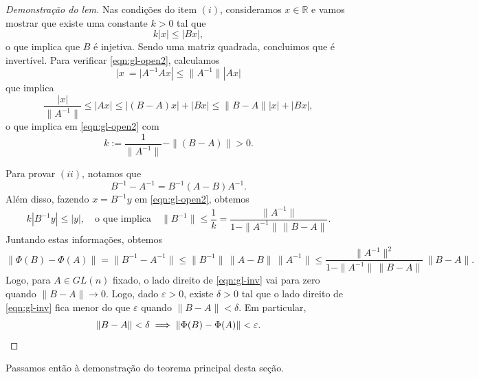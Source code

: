\begin{proof}[Demonstração do lem]
	Nas condições do item $(i)$, consideramos $x \in \mathbb{R}$ e vamos mostrar que existe uma constante $k>0$ tal que
	\begin{equation}\label{eqn:gl-open2}
	k |x| \le |Bx|,
	\end{equation} o que implica que $B$ é injetiva. Sendo uma matriz quadrada, concluimos que é invertível. Para verificar \eqref{eqn:gl-open2}, calculamos
	\[
	|x\ = |A^{-1} A x| \le \|A^{-1}\| | A x| 
	\] que implica
	\[
	\frac{|x|}{ \|A^{-1}\|} \le |A x| \le |(B-A)x| + |Bx| \le \|B-A\| |x| + |Bx|,
	\] o que implica em \eqref{eqn:gl-open2} com 
	\[
	k := \frac{1}{\|A^{-1}\|} - \|(B-A)\| > 0.
	\]
	
	Para provar $(ii)$, notamos que 
	\[
	B^{-1} - A^{-1} = B^{-1} (A - B) A^{-1}.
	\] Além disso, fazendo $x = B^{-1}y$ em \eqref{eqn:gl-open2}, obtemos
	\[
	k | B^{-1}y | \le |y|, \quad \text{o que implica} \quad \|B^{-1}\| \le \frac{1}{k} = \frac{\| A^{-1} \|}{1 - \|A^{-1}\| \, \|B-A\|}.
	\] Juntando estas informações, obtemos
	\begin{equation}\label{eqn:gl-inv}
	\| \Phi (B) - \Phi (A) \| = \|B^{-1} - A^{-1}\| \le \| B^{-1} \| \, \| A - B \| \, \| A^{-1} \| \le \frac{\| A^{-1} \|^2}{1 - \|A^{-1}\| \, \|B-A\|} \, \|B-A\|.
	\end{equation} Logo, para $A \in GL(n)$ fixado, o lado direito de \eqref{eqn:gl-inv} vai para zero quando $\|B- A\| \to 0$. Logo, dado $\varepsilon> 0$, existe $\delta > 0$ tal que o lado direito de \eqref{eqn:gl-inv} fica menor do que $\varepsilon$ quando $\|B-A\| < \delta$. Em particular,
	\[
	\|B-A\| < \delta \implies \| \Phi (B) - \Phi (A) \| < \varepsilon. \qedhere
	\]
\end{proof}

Passamos então à demonstração do teorema principal desta seção.

